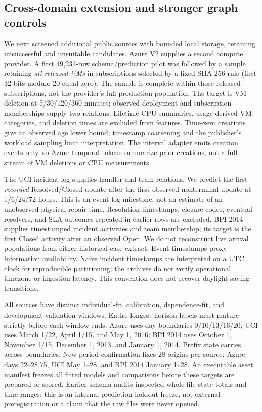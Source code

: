 \subsection{Cross-domain extension and stronger graph controls}
We next screened additional public sources with bounded local storage, retaining
unsuccessful and unsuitable candidates. Azure V2 \citep{azure2019} supplies a
second compute provider. A first 49,231-row schema/prediction pilot was followed
by a sample retaining \emph{all released VMs} in subscriptions selected by a
fixed SHA-256 rule (first 32 bits modulo 20 equal zero). The sample is complete
within those released subscriptions, not the provider's full production
population. The target is VM deletion at 5/30/120/360 minutes; observed deployment
and subscription memberships supply two relations. Lifetime CPU summaries,
usage-derived VM categories, and deletion times are excluded from features.
Time-zero creations give an observed age lower bound; timestamp coarsening and
the publisher's workload sampling limit interpretation. The interval adapter
emits creation events only, so Azure temporal tokens summarize prior creations,
not a full stream of VM deletions or CPU measurements.

The UCI incident log \citep{amaral2018} supplies handler and team relations.
We predict the first \emph{recorded} Resolved/Closed update after the first
observed nonterminal update at 1/6/24/72 hours. This is an event-log milestone,
not an estimate of an unobserved physical repair time. Resolution timestamps,
closure codes, eventual resolvers, and SLA outcomes repeated in earlier rows
are excluded. BPI 2014 \citep{vandongen2014activity} supplies timestamped incident
activities and team membership; its target is the first Closed activity after
an observed Open. We do not reconstruct live arrival populations from either
historical case extract. Event timestamps proxy information availability.
Naive incident timestamps are interpreted on a UTC clock for reproducible
partitioning; the archives do not verify operational timezone or ingestion
latency. This convention does not recover daylight-saving transitions.

All sources have distinct individual-fit, calibration, dependence-fit, and
development-validation windows. Entire longest-horizon labels must mature
strictly before each window ends. Azure uses day boundaries 0/10/13/16/20;
UCI uses March 1/22, April 1/15, and May 1, 2016; BPI 2014 uses October 1,
November 1/15, December 1, 2013, and January 1, 2014. Prefix state carries
across boundaries. New-period confirmation fixes 28 origins per source:
Azure days 22--28.75, UCI May 1--28, and BPI 2014 January 1--28.
An executable asset manifest freezes all fitted models and comparisons before
these targets are prepared or scored. Earlier schema audits inspected whole-file
state totals and time ranges; this is an internal prediction-holdout freeze,
not external preregistration or a claim that the raw files were never opened.

